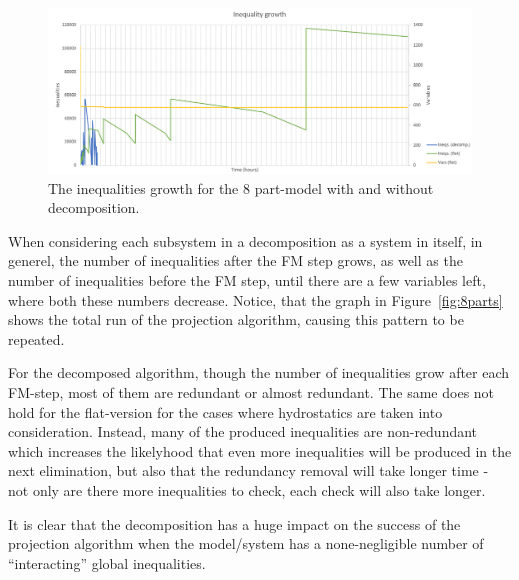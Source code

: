 \begin{figure}
	\centering
		\includegraphics[scale=0.6]{figures/compare.PNG}
	\caption{The inequalities growth for the 8 part-model with and without decomposition.}
	\label{fig:compare}
\end{figure}
When considering each subsystem in a decomposition as a system in itself, in generel, the number of inequalities after the FM step grows, as well as the number of inequalities before the FM step, until there are a few variables left, where both these numbers decrease. Notice, that the graph in Figure~\ref{fig:8parts} shows the total run of the projection algorithm, causing this pattern to be repeated.

For the decomposed algorithm, though the number of inequalities grow after each FM-step, most of them are redundant or almost redundant. The same does not hold for the flat-version for the cases where hydrostatics are taken into consideration. Instead, many of the produced inequalities are non-redundant which increases the likelyhood that even more inequalities will be produced in the next elimination, but also that the redundancy removal will take longer time - not only are there more inequalities to check, each check will also take longer. 


It is clear that the decomposition has a huge impact on the success of the projection algorithm when the model/system has a none-negligible number of ``interacting'' global inequalities.

